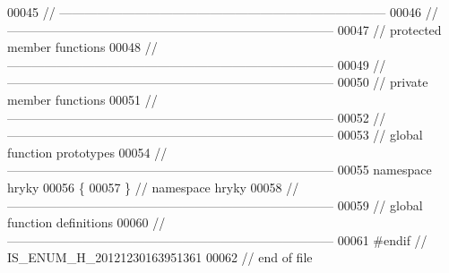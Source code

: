 \begin{DoxyCode}
00045 \textcolor{comment}{//
      ------------------------------------------------------------------------------}
00046 \textcolor{comment}{//
      ------------------------------------------------------------------------------}
00047 \textcolor{comment}{// protected member functions}
00048 \textcolor{comment}{//
      ------------------------------------------------------------------------------}
00049 \textcolor{comment}{//
      ------------------------------------------------------------------------------}
00050 \textcolor{comment}{// private member functions}
00051 \textcolor{comment}{//
      ------------------------------------------------------------------------------}
00052 \textcolor{comment}{//
      ------------------------------------------------------------------------------}
00053 \textcolor{comment}{// global function prototypes}
00054 \textcolor{comment}{//
      ------------------------------------------------------------------------------}
00055 \textcolor{keyword}{namespace }hryky
00056 \{
00057 \} \textcolor{comment}{// namespace hryky}
00058 \textcolor{comment}{//
      ------------------------------------------------------------------------------}
00059 \textcolor{comment}{// global function definitions}
00060 \textcolor{comment}{//
      ------------------------------------------------------------------------------}
00061 \textcolor{preprocessor}{#endif // IS\_ENUM\_H\_20121230163951361}
00062 \textcolor{preprocessor}{}\textcolor{comment}{// end of file}
\end{DoxyCode}
